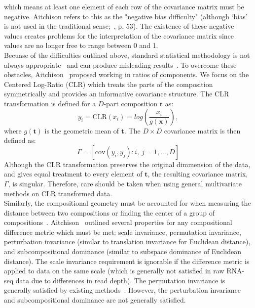 \documentclass{article}\usepackage[]{graphicx}\usepackage[]{color}
\begin{document}
which means at least one element of each row of the covariance matrix must be negative. Aitchison refers to this as the "negative bias difficulty" (although `bias' is not used in the traditional sense;~\cite{Aitchison1986}, p. 53). The existence of these negative values creates problems for the interpretation of the covariance matrix since values are no longer free to range between 0 and 1.\\


Becuase of the difficulties outlined above, standard statistical methodology is not always appropriate~\cite{Aitchison1986} and can produce misleading results~\cite{Lovell2015}.  To overcome these obstacles, Aitchison~\cite{Aitchison1980} proposed working in ratios of components. We focus on the Centered Log-Ratio (CLR) which treats the parts of the composition symmetrically and provides an informative covariance structure.  The CLR transformation is defined for a $D$-part composition $\mathbf{t}$ as:
\begin{equation}
y_i  = \text{CLR}(x_i) = log \left(\frac{x_i}{g(\mathbf{x})} \right),
\label{clr}
\end{equation}
where $g(\mathbf{t})$ is the geometric mean of $\mathbf{t}$.  The $D \times D$ covariance matrix is then defined as:
\begin{equation}
\Gamma = \left[\text{cov}\left(y_i, y_j \right): i,\ j = 1, ..., D \right]
\label{gamma}
\end{equation}
Although the CLR transformation preserves the original dimmension of the data, and gives equal treatment to every element of $\mathbf{t}$, the resulting covariance matrix, $\Gamma$, is singular.  Therefore, care should be taken when using general multivariate methods on CLR transformed data.\\

Similarly, the compositional geometry must be accounted for when measuring the distance between two compositions or finding the center of a group of compositions~\cite{Aitchison2000}.  Aitchison~\cite{Aitchison1992} outlined several properties for any compositional difference metric which must be met: scale invariance, permutation invariance, perturbation invariance (similar to translation invariance for Euclidean distance), and subcompositional dominance (similar to subspace dominance of Euclidean distance).  The scale invariance requirement is ignorable if the difference metric is applied to data on the same scale (which is generally not satisfied in raw RNA-seq data due to differences in read depth). The permutation invariance is generally satisfied by existing methods~\cite{Martin-Fernandez1998}. However, the perturbation invariance and subcompositional dominance are not generally satisfied. \\
\end{document}
